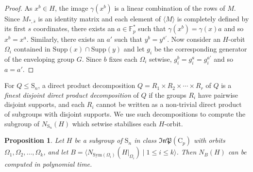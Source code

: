 \documentclass[11pt,a4paper]{article}
\newtheorem{proposition}[theorem]{Proposition}
\theoremstyle{definition}
\theoremstyle{remark}
\newcommand{\Sym}[0]{\mathrm{Sym}}
\newcommand{\factor}{R}
\newcommand{\InP}{\mathfrak{InP}}
\newcommand{\Sy}{\mathrm{S}}
\newcommand{\Cy}{\mathrm{C}}
\newcommand{\Supp}{\mathrm{Supp}}
\begin{document}
\begin{proof}
As $x^{b} \in H$, the image $\gamma(x^{b})$ is a linear combination of the rows of $M$.
Since $M_{*, \overline{s}}$ is an identity matrix and each element of $\langle M \rangle$ is completely defined by its first $s$ coordinates, 
there exists an $a \in \mathds{F}_p^*$ such that $\gamma(x^{b}) = \gamma(x)a$ and so $x^{b} = x^{a}$.
Similarly, there exists an $a'$ such that $y^{b} = y^{a'}$.  
Now consider an $H$-orbit $\Omega_i$ contained in $\Supp(x) \cap \Supp(y)$ and let $g_i$ be the corresponding generator of the enveloping group $G$.  
Since $b$ fixes each $\Omega_i$ setwise, $g_i^{b} = g_i^a = g_i^{a'}$ and so $a=a'$. 
\end{proof}


For $Q \leq \Sy_n$, a direct product decomposition $Q = \factor_1 \times \factor_2 \times \cdots \times \factor_r$ of $Q$ is a \emph{finest disjoint direct product decomposition} of $Q$ if the groups $\factor_i$ have pairwise disjoint supports, and each $\factor_i$ cannot be written as a non-trivial direct product of subgroups with disjoint supports. 
We use such decompositions to compute the subgroup of $N_{\Sy_n}(H)$ which setwise stabilises each $H$-orbit. 

\begin{proposition} \label{computing norm in inner action}
Let $H$ be a subgroup of $\Sy_n$ in class $\InP(\Cy_p)$ with orbits $\Omega_1, \Omega_2, \ldots, \Omega_k$, and let $B = \langle N_{\Sym(\Omega_i)}(H|_{\Omega_i}) \mid 1\leq i \leq k \rangle$. 
Then $N_{B}(H)$ can be computed in polynomial time.
\end{proposition}
\end{document}
